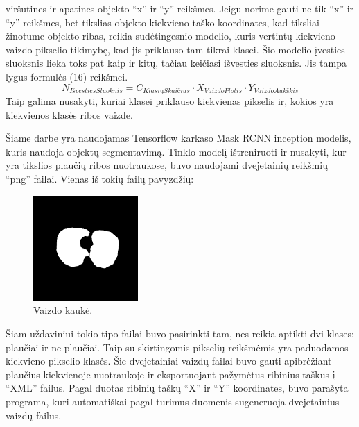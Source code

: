 \documentclass{VUMIFInfKursinis}
\begin{document}
viršutines ir apatines objekto \enquote{x} ir \enquote{y} reikšmes. Jeigu norime gauti ne tik \enquote{x} ir \enquote{y} reikšmes, bet tikslias
objekto kiekvieno taško koordinates, kad tiksliai žinotume objekto ribas, reikia sudėtingesnio modelio,
kuris vertintų kiekvieno vaizdo pikselio tikimybę, kad jis priklauso tam tikrai klasei.
Šio modelio įvesties sluoksnis lieka toks pat kaip ir kitų, tačiau keičiasi išvesties sluoksnis. Jis tampa
lygus formulės (16) reikšmei.
\begin{equation}
N_{IšvestiesSluoknis} = C_{KlasiųSkaičius} \cdot X_{VaizdoPlotis} \cdot Y_{VaizdoAukškis}
\end{equation}
Taip galima nusakyti, kuriai klasei priklauso kiekvienas pikselis ir, kokios yra
kiekvienos klasės ribos vaizde.
\par
Šiame darbe yra naudojamas Tensorflow karkaso Mask RCNN inception modelis, kuris naudoja
objektų segmentavimą. Tinklo modelį ištreniruoti ir nusakyti, kur yra tikslios plaučių
ribos nuotraukose, buvo naudojami dvejetainių reikšmių \enquote{png} failai. Vienas iš tokių
failų pavyzdžių:

\begin{figure}[ht]
  \centering
  \includegraphics[width=4cm,height=4cm,keepaspectratio]{mask.png}
  \caption{Vaizdo kaukė.}
  \label{fig:kaukė1}
\end{figure}

\par
Šiam uždaviniui tokio tipo failai buvo pasirinkti tam, nes reikia aptikti dvi klases:
plaučiai ir ne plaučiai. Taip su skirtingomis pikselių reikšmėmis yra paduodamos kiekvieno
pikselio klasės. Šie dvejetainiai vaizdų failai buvo gauti apibrėžiant plaučius kiekvienoje
nuotraukoje ir eksportuojant pažymėtus ribinius taškus į \enquote{XML} failus. Pagal duotas ribinių
taškų \enquote{X} ir \enquote{Y} koordinates, buvo parašyta programa, kuri automatiškai pagal turimus
duomenis sugeneruoja dvejetainius vaizdų failus.

\end{document}

